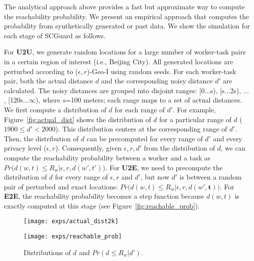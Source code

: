 \documentclass{USC-Thesis}
\numberwithin{equation}{chapter}
\begin{document}
The analytical approach above provides a fast but approximate way to compute the reachability probability. We present an empirical approach that computes the probability from synthetically generated or past data. We show the simulation for each stage of SCGuard as follows.

For \textbf{U2U}, we generate random locations for a large number of worker-task pairs in a certain region of interest (i.e., Beijing City). All generated locations are perturbed according to ($\epsilon,r$)-Geo-I using random seeds. For each worker-task pair, both the actual distance $d$ and the corresponding noisy distance $d'$ are calculated. The noisy distances are grouped into disjoint ranges: [0...s), [s...2s), ... , [120s...$\infty$), where $s$=100 meters; each range maps to a set of actual distances. We first compute a distribution of $d$ for each range of $d'$. For example, Figure~\ref{fig:actual_dist} shows the distribution of $d$ for a particular range of $d$ ($1900\le d'< 2000$). This distribution centers at the corresponding range of $d'$. Then, the distribution of $d$ can be precomputed for every range of $d'$ and every privacy level ($\epsilon, r$). Consequently, given $\epsilon, r, d'$ from the distribution of $d$, we can compute the reachability probability between a worker and a task as $\mathit{Pr\big(d(w,t) \le R_w | \epsilon,r,d(w',t')\big)}$.
For \textbf{U2E}, we need to precompute the distribution of $d$ for every range of $\epsilon, r$ and $d'$, but now $d'$ is between a random pair of perturbed and exact locations: $\mathit{Pr\big(d(w,t) \le R_w | \epsilon,r,d(w',\mathbf{t})\big)}$.
For \textbf{E2E}, the reachability probability becomes a step function because $d(w,t)$ is exactly computed at this stage (see Figure~\ref{fig:reachable_prob}).

\begin{figure}[ht]
	\begin{minipage}[b]{.45\linewidth}
		\centering
		\texttt{[image: exps/actual\_dist2k]}
		\captionsetup{format=hang}
		\label{fig:actual_dist}
	\end{minipage}
	\vspace{10pt}
	\begin{minipage}[b]{.45\linewidth}
		\centering
		\texttt{[image: exps/reachable\_prob]}
        \captionsetup{format=hang}
		\label{fig:reachable_prob}
	\end{minipage}
	\caption{Distributions of $d$ and $Pr(d\le R_w|d')$.}
	\label{fig:empirical}
\end{figure}
\end{document}
